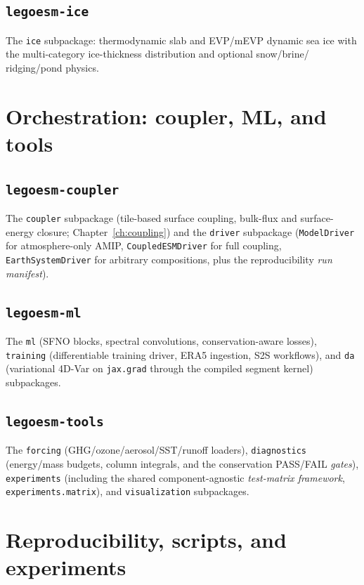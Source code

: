 \documentclass[11pt,twoside]{report}
\begin{document}
\subsection{\texttt{legoesm-ice}}
The \texttt{ice} subpackage: thermodynamic slab and EVP/mEVP dynamic sea ice
with the multi-category ice-thickness distribution and optional snow/brine/
ridging/pond physics.

\section{Orchestration: coupler, ML, and tools}
\label{sec:arch-orchestration}

\subsection{\texttt{legoesm-coupler}}
The \texttt{coupler} subpackage (tile-based surface coupling, bulk-flux and
surface-energy closure; Chapter~\ref{ch:coupling}) and the \texttt{driver}
subpackage (\texttt{ModelDriver} for atmosphere-only AMIP, \texttt{CoupledESMDriver}
for full coupling, \texttt{EarthSystemDriver} for arbitrary compositions, plus
the reproducibility \emph{run manifest}).

\subsection{\texttt{legoesm-ml}}
The \texttt{ml} (SFNO blocks, spectral convolutions, conservation-aware losses),
\texttt{training} (differentiable training driver, ERA5 ingestion, S2S
workflows), and \texttt{da} (variational 4D-Var on \texttt{jax.grad} through the
compiled segment kernel) subpackages.

\subsection{\texttt{legoesm-tools}}
The \texttt{forcing} (GHG/ozone/aerosol/SST/runoff loaders), \texttt{diagnostics}
(energy/mass budgets, column integrals, and the conservation PASS/FAIL
\emph{gates}), \texttt{experiments} (including the shared component-agnostic
\emph{test-matrix framework}, \texttt{experiments.matrix}), and
\texttt{visualization} subpackages.

\section{Reproducibility, scripts, and experiments}
\label{sec:arch-reproducibility}
\end{document}
